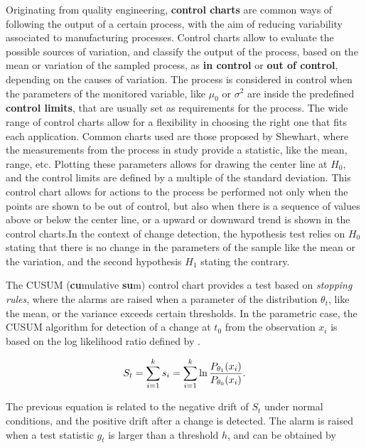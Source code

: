\par Originating from quality engineering, \textbf{control charts} are common ways of following the output of a certain process, with the aim of reducing variability
associated to manufacturing processes. Control charts allow to evaluate the possible sources of variation, and classify the output of the process, based on the mean
or variation of the sampled process, as \textbf{in control} or \textbf{out of control}, depending on the causes of variation. The process is considered in control
when the parameters of the monitored variable, like $\mu_0$ or $\sigma^2$ are inside the predefined \textbf{control limits}, that are usually set as requirements for
the process. The wide range of control charts allow for a flexibility in choosing the right one that fits each application. Common charts used are those proposed by 
Shewhart, where the measurements from the process in study provide a statistic, like the mean, range, etc. Plotting these parameters allows for drawing the center
line at $H_0$, and the control limits are defined by a multiple of the standard deviation. This control chart allows for actions to the process be performed not only
when the points are shown to be out of control, but also when there is a sequence of values above or below the center line, or a upward or downward trend is shown in
the control charts.In the context of change detection, the hypothesis test relies on $H_0$ stating that there is no change in the parameters of the sample like the
mean or the variation, and the second hypothesis $H_1$ stating the contrary.

\par The CUSUM (\textbf{cu}mulative \textbf{su}m) control chart provides a test based on \textit{stopping rules}, where the alarms are raised when a parameter
of the distribution $\theta_t$, like the mean, or the variance exceeds certain thresholds. In the parametric case, the CUSUM algorithm for detection of a change at
$t_0$ from the observation $x_i$ is based on the log likelihood ratio defined by \cite{ahmed_novel_2008}.

\begin{equation*}
\centering
    S_t = \sum_{i=1}^k s_i = \sum_{i=1}^k\ln \frac {P_{\theta_1}(x_i)} {P_{\theta_0}(x_i)}.
\end{equation*}

\par The previous equation is related to the negative drift of $S_t$ under normal conditions, and the positive drift after a change is detected. The alarm is raised 
when a test statistic $g_t$ is larger than a threshold $h$, and can be obtained by 

